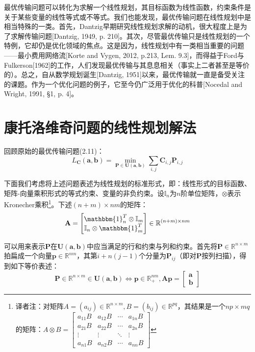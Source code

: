 \documentclass[cn,10pt,math=newtx,citestyle=gb7714-2015,bibstyle=gb7714-2015]{elegantbook}
\begin{document}
最优传输问题可以转化为求解一个线性规划，其目标函数为线性函数，约束条件是关于某些变量的线性等式或不等式。我们也能发现，最优传输问题在线性规划中是相当特殊的一类。首先，Dantzig早期研究线性规划求解的动机，很大程度上是为了求解传输问题[Dantzig, 1949, p. 210]。其次，尽管最优传输只是线性规划的一个特例，它却仍是优化领域的焦点。这是因为，线性规划中有一类相当重要的问题——最小费用网络流[Korte and Vygen, 2012, p.213, Lem. 9.3]，而得益于Ford与Fulkerson[1962]的工作，人们发现最优传输与其息息相关（事实上二者甚至是等价的）。总之，自从数学规划诞生[Dantzig, 1951]以来，最优传输就一直是备受关注的课题。作为一个优化问题的例子，它至今仍广泛用于优化的科普[Nocedal and Wright, 1991, \S 1, p. 4]。

\section{康托洛维奇问题的线性规划解法}

回顾原始的最优传输问题(2.11)：
\begin{equation}
    \label{3.1}
    L_\mathbf{C}(\mathbf{a,b})=\min\limits_{\mathbf{P}\in\mathbf{U(a,b)}} \sum_{i,j} \mathbf{C}_{i,j}\mathbf{P}_{i,j}
\end{equation}

下面我们考虑将上述问题表述为线性规划的标准形式，即：线性形式的目标函数、矩阵-向量乘积形式的等式约束、变量的非负约束。设$\mathbb{I}_n$为$n$阶单位矩阵，$\otimes$表示Kronecher乘积\footnote{译者注：对矩阵$A=(a_{ij})\in\mathbb{R}^{n\times m},B=(b_{ij})\in\mathbb{R}^{pq}$，其结果是一个$np\times mq$的矩阵：$A\otimes B=\begin{bmatrix} a_{11}B & a_{12}B & \cdots & a_{1n}B\\ a_{21}B & a_{22}B & \cdots & a_{2n}B \\ \vdots & \vdots & \ddots & \vdots \\ a_{n1}B & a_{n2}B & \cdots & a_{nn}B\end{bmatrix}$}。下述$(n+m)\times nm$的矩阵：
\begin{equation*}
    \mathbf{A}=\begin{bmatrix} \mathbbm{1}_n^T\otimes \mathbb{I}_m\\ \mathbb{I}_n\otimes \mathbbm{1}_m^T\end{bmatrix}\in\mathbb{R}^{(n+m)\times nm}
\end{equation*}

可以用来表示$\mathbf{P}$在$\mathbf{U(a,b)}$中应当满足的行和约束与列和约束。首先将$\mathbf{P}\in\mathbb{R}^{n\times m}$拍扁成一个向量$\mathbf{p}\in\mathbb{R}^{nm}$，其第$i+n(j-1)$个分量为$\mathbf{P}_{ij}$（即对$\mathbf{P}$按列扫描），得到如下等价表述：
\begin{equation*}
    \mathbf{P}\in\mathbb{R}^{n\times m}\in\mathbf{U(a,b)} \Longleftrightarrow \mathbf{p}\in\mathbb{R}^{nm}_+,\mathbf{Ap}=\begin{bmatrix}\mathbf{a}\\ \mathbf{b}\end{bmatrix}
\end{equation*}
\end{document}
